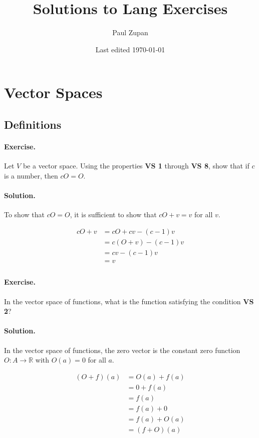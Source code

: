\documentclass[12pt, titlepage]{article}
\title{Solutions to Lang Exercises}
\author{Paul Zupan}
\date{Last edited \today}
\newenvironment{exercise}{\paragraph{Exercise.}}{}
\newenvironment{solution}{\paragraph{Solution.}}{}
\newcommand{\R}{\mathbb{R}}
\begin{document}
\maketitle

\section{Vector Spaces}

\subsection{Definitions}

\begin{exercise}
  Let $V$ be a vector space. Using the properties \textbf{VS 1} through
  \textbf{VS 8}, show that if $c$ is a number, then $cO = O$.
\end{exercise}

\begin{solution}
  To show that $cO = O$, it is sufficient to show that $cO + v = v$ for all
  $v$.

  \[
    \begin{aligned}
      cO + v
        & = cO + cv - (c - 1)v \\
        & = c(O + v) - (c - 1)v \\
        & = cv - (c - 1)v \\
        & = v \\
    \end{aligned}
  \]
\end{solution}

\begin{exercise}
  In the vector space of functions, what is the function satisfying the
  condition \textbf{VS 2}?
\end{exercise}

\begin{solution}
  In the vector space of functions, the zero vector is the constant zero
  function $O : A \to \R$ with $O(a) = 0$ for all $a$.

  \[
    \begin{aligned}
      (O + f)(a)
        & = O(a) + f(a) \\
        & = 0 + f(a)    \\
        & = f(a)        \\
        & = f(a) + 0    \\
        & = f(a) + O(a) \\
        & = (f + O)(a)  \\
    \end{aligned}
  \]
\end{solution}
\end{document}
